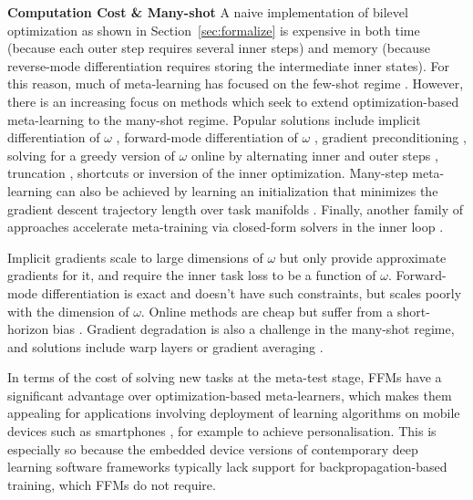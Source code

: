 \documentclass[10pt,journal,compsoc]{IEEEtran}
\newcommand{\keypoint}[1]{\vspace{0.1cm}\noindent\textbf{#1}\quad}
\begin{document}
\keypoint{Computation Cost \& Many-shot}
A naive implementation of bilevel optimization as shown in Section~\ref{sec:formalize} is expensive in both time (because each outer step requires several inner steps) and memory (because reverse-mode differentiation requires storing the intermediate inner states). For this reason, much of meta-learning has focused on the few-shot regime \cite{finn2017maml}. However, there is an increasing focus on methods which seek to extend optimization-based meta-learning to the many-shot regime. Popular solutions include implicit differentiation of $\omega$ \cite{pedregosa2016approxgrads, rajeswaran2019metaimplicit, lorraine2019optmillionsofhyperparams}, forward-mode differentiation of $\omega$ \cite{Williams1989algorithmrecurrentneuralnetwork, franceschi2017hyperopt, micaelli2020nongreedy}, gradient preconditioning \cite{flennerhag2020warpgrad}, solving for a greedy version of $\omega$ online by alternating inner and outer steps \cite{baydin2017hd, liu2019darts, li2019featurecritic}, truncation \cite{shaban2018truncated}, shortcuts \cite{fu2016drmad} or inversion \cite{maclaurin2015gradienthyper} of the inner optimization. Many-step meta-learning can also be achieved by learning an initialization that minimizes the gradient descent trajectory length over task manifolds \cite{flennerhag2019transferring}. Finally, another family of approaches accelerate meta-training via closed-form solvers in the inner loop \cite{bertinetto2018closedformmeta,lee2019metaopt}.

Implicit gradients scale to large dimensions of $\omega$ but only provide approximate gradients for it, and require the inner task loss to be a function of $\omega$. Forward-mode differentiation is exact and doesn't have such constraints, but scales poorly with the dimension of $\omega$. Online methods are cheap but suffer from a short-horizon bias \cite{wu2018shortHorizonBiasL2L}. Gradient degradation is also a challenge in the many-shot regime, and solutions include warp layers \cite{flennerhag2020warpgrad} or gradient averaging \cite{micaelli2020nongreedy}. 

In terms of the cost of solving new tasks at the meta-test stage, FFMs have a significant advantage over optimization-based meta-learners, which makes them appealing for applications involving deployment of learning algorithms 
on mobile devices such as smartphones \cite{ignatov2019aismartphone}, for example to achieve personalisation. This is especially so because the embedded device versions of contemporary deep learning software frameworks typically lack support for backpropagation-based training, which FFMs do not require.
 
\end{document}
